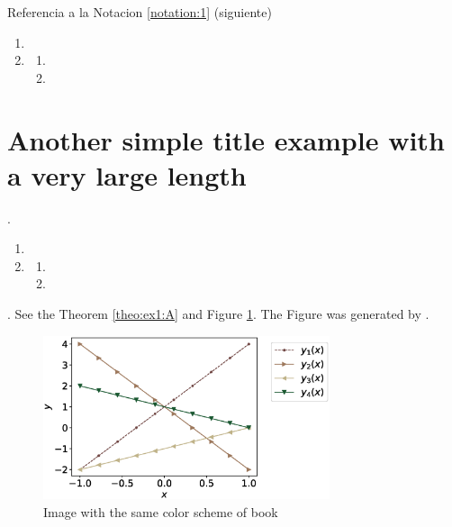 \lipsum[1][1-3] %

Referencia a la Notacion \ref{notation:1} (siguiente)

\begin{notation}[Título C]
\label{notation:1}
\lipsum[1][1-2]
\begin{enumerate}
\item \lipsum[1][1-2]
\item \lipsum[1][1-2]
\begin{enumerate}
\item \lipsum[1][1-2]
\item \lipsum[1][1-2]
\end{enumerate}
\end{enumerate}
\end{notation}

\section{Another simple title example with a very large length}

\lipsum[1][1-3].
\begin{enumerate}
\item \lipsum[1][1-2]
\item \lipsum[1][1-2]
\begin{enumerate}
\item \lipsum[1][1-2]
\item \lipsum[1][1-2]
\end{enumerate}
\end{enumerate}
\lipsum[1][1-3]. See the Theorem \ref{theo:ex1:A} and Figure \ref{fig:exemplo}.
The Figure was generated by .

\begin{figure}[htbp] %
  \centering          %
  \includegraphics[width=0.75\textwidth]{chapters/cap1/python/example.eps}
  \caption{Image with the same color scheme of book} %
  \label{fig:exemplo} %
\end{figure}


